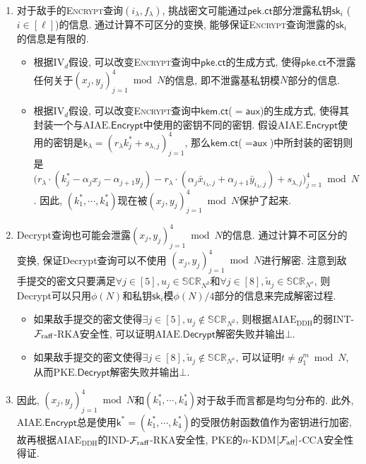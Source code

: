 \begin{enumerate}
    \item 对于敌手的\textsc{Encrypt}查询$(i_\lambda, f_\lambda)$, 挑战密文可能通过$\mathsf{pek.ct}$部分泄露私钥$\mathsf{sk}_i$ ($i \in [\ell]$)的信息. 通过计算不可区分的变换, 能够保证\textsc{Encrypt}查询泄露的$\mathsf{sk}_i$的信息是有限的.
         \begin{itemize}
         \item 根据IV$_d$假设, 可以改变\textsc{Encrypt}查询中$\mathsf{pke.ct}$的生成方式, 使得$\mathsf{pke.ct}$不泄露任何关于$(x_{j}, y_{j})_{j = 1}^4 \bmod N$的信息, 即不泄露基私钥模$N$部分的信息.
         \item 根据IV$_d$假设, 可以改变\textsc{Encrypt}查询中$\mathsf{kem.ct}$($= \mathsf{aux}$)的生成方式, 使得其封装一个与$\text{AIAE}.\mathsf{Encrypt}$中使用的密钥不同的密钥.
           假设$\text{AIAE}.\mathsf{Encrypt}$使用的密钥是$\mathsf{k}_\lambda = (r_{\lambda}{k}^*_j+s_{\lambda,j})_{j = 1}^4$, 那么$\textsf{kem.ct}$($= \textsf{aux}$)中所封装的密钥则是$\big(r_\lambda \cdot (k^*_j - \alpha_j x_j - \alpha_{j+1} y_j) - r_\lambda \cdot (\alpha_j \bar{x}_{i_\lambda,j} + \alpha_{j+1} \bar{y}_{i_\lambda,j}) + s_{\lambda,j}\big)_{j = 1}^4 \bmod N$. 因此, $(k^*_1, \cdots, k^*_4)$现在被$(x_{j}, y_{j})_{j = 1}^4 \bmod N$保护了起来.
         \end{itemize}
         \item \textsf{Decrypt}查询也可能会泄露$(x_{j}, y_{j})_{j = 1}^4 \bmod N$的信息.
 通过计算不可区分的变换, 保证\textsf{Decrypt}查询可以不使用 $(x_{j}, y_{j})_{j = 1}^4 \bmod N$进行解密.   注意到敌手提交的密文只要满足$\forall {j\in [5]}, u_{j} \in \mathbb{SCR}_{N^2}$和$\forall {j\in [8]},  \tilde{u}_{j} \in \mathbb{SCR}_{N^s}$, 则\textsf{Decrypt}可以只用$\phi(N)$和私钥$\mathsf{sk}_i$模$\phi(N)/4$部分的信息来完成解密过程.
         \begin{itemize}
         \item 如果敌手提交的密文使得$\exists j \in [5], u_{j} \notin \mathbb{SCR}_{N^2}$, 则根据$\text{AIAE}_{\text{DDH}}$的弱INT-$\mathcal{F}_{\text{raff}}$-RKA安全性, 可以证明$\text{AIAE}.\mathsf{Decrypt}$解密失败并输出$\bot$.        
         \item 如果敌手提交的密文使得$\exists j \in [8], \tilde{u}_{j} \notin \mathbb{SCR}_{N^s}$, 可以证明$t\neq g_1^m \bmod N$, 从而$\text{PKE}.\mathsf{Decrypt}$解密失败并输出$\bot$.
         \end{itemize}
         \item 因此, $(x_{j}, y_{j})_{j = 1}^4 \bmod N$和$(k^*_1, \cdots, k^*_4)$对于敌手而言都是均匀分布的. 此外, $\text{AIAE}.\mathsf{Encrypt}$总是使用$\mathsf{k}^* = (k^*_1, \cdots, k^*_4)$的受限仿射函数值作为密钥进行加密, 故再根据$\text{AIAE}_{\text{DDH}}$的IND-$\mathcal{F}_{\text{raff}}$-RKA安全性, PKE的$n$-KDM$[\mathcal{F}_{\text{aff}}]$-CCA安全性得证.
\end{enumerate}

